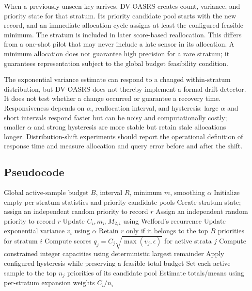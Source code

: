 \documentclass[11pt]{article}
\begin{document}
When a previously unseen key arrives, DV-OASRS creates count, variance, and priority state for that stratum. Its priority candidate pool starts with the new record, and an immediate allocation cycle assigns at least the configured feasible minimum. The stratum is included in later score-based reallocation. This differs from a one-shot pilot that may never include a late sensor in its allocation. A minimum allocation does not guarantee high precision for a rare stratum; it guarantees representation subject to the global budget feasibility condition.

The exponential variance estimate can respond to a changed within-stratum distribution, but DV-OASRS does not thereby implement a formal drift detector. It does not test whether a change occurred or guarantee a recovery time. Responsiveness depends on $\alpha$, reallocation interval, and hysteresis: large $\alpha$ and short intervals respond faster but can be noisy and computationally costly; smaller $\alpha$ and strong hysteresis are more stable but retain stale allocations longer. Distribution-shift experiments should report the operational definition of response time and measure allocation and query error before and after the shift.

\subsection{Pseudocode}

\begin{algorithm}[ht]
\caption{DV-OASRS update and allocation (conceptual)}
\begin{algorithmic}[1]
\Require Global active-sample budget $B$, interval $R$, minimum $m$, smoothing $\alpha$
\State Initialize empty per-stratum statistics and priority candidate pools
    \State Create stratum state; assign an independent random priority to record $r$
  \Else
    \State Assign an independent random priority to record $r$
  \EndIf
  \State Update $C_i,m_i,M_{2,i}$ using Welford's recurrence
  \State Update exponential variance $v_i$ using $\alpha$
  \State Retain $r$ only if it belongs to the top $B$ priorities for stratum $i$
    \State Compute scores $q_j=C_j\sqrt{\max(v_j,\epsilon)}$ for active strata $j$
    \State Compute constrained integer capacities using deterministic largest remainder
    \State Apply configured hysteresis while preserving a feasible total budget
    \State Set each active sample to the top $n_j$ priorities of its candidate pool
  \EndIf
\EndFor
\State Estimate totals/means using per-stratum expansion weights $C_i/n_i$
\end{algorithmic}
\end{algorithm}
\end{document}
